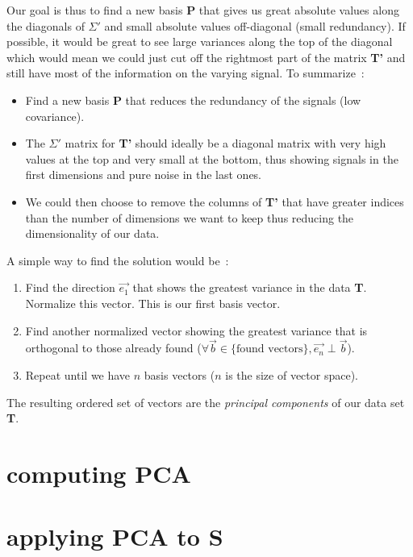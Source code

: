 \documentclass[11pt,twocolumn]{amsart} %
\begin{document}
Our goal is thus to find a new basis \textbf{P} that gives us great absolute values along the diagonals of $\Sigma'$ and small absolute values off-diagonal (small redundancy). If possible, it would be great to see large variances along the top of the diagonal which would mean we could just cut off the rightmost part of the matrix \textbf{T'} and still have most of the information on the varying signal. To summarize~:
\begin{itemize}
  \item Find a new basis \textbf{P} that reduces the redundancy of the signals (low covariance).
  \item The $\Sigma'$ matrix for \textbf{T'} should ideally be a diagonal matrix with very high values at the top and very small at the bottom, thus showing signals in the first dimensions and pure noise in the last ones.
  \item We could then choose to remove the columns of \textbf{T'} that have greater indices than the number of dimensions we want to keep thus reducing the dimensionality of our data.
\end{itemize}

A simple way to find the solution would be~:
\begin{enumerate}
  \item Find the direction $\vec{e_1}$ that shows the greatest variance in the data \textbf{T}. Normalize this vector. This is our first basis vector.
  \item Find another normalized vector showing the greatest variance that is orthogonal to those already found ($\forall \vec{b}\in \{\text{found vectors}\}, \vec{e_n} \perp \vec{b}$).
  \item Repeat until we have $n$ basis vectors ($n$ is the size of vector space).
\end{enumerate}

The resulting ordered set of vectors are the \emph{principal components} of our data set \textbf{T}.

\section{computing PCA}



\section{applying PCA to \textbf{S}}
\end{document}
